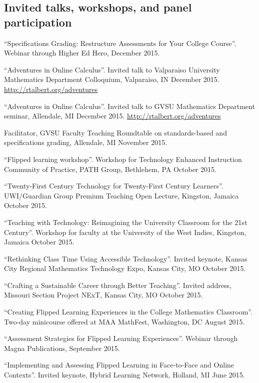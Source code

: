 \documentclass[letterpaper]{article}
\renewenvironment{itemize}{
  \begin{list}{}{
    \setlength{\leftmargin}{1.5em}
	\setlength{\itemsep}{0in}
  }
}{
  \end{list}
}
\begin{document}
\subsection*{Invited talks, workshops, and panel participation}
\begin{itemize}
	\item ``Specifications Grading: Restructure Assessments for Your College Course''. Webinar through Higher Ed Hero, December 2015. 
	\item ``Adventures in Online Calculus''. Invited talk to Valparaiso University Mathematics Department Colloquium, Valparaiso, IN December 2015. \url{http://rtalbert.org/adventures}
	\item ``Adventures in Online Calculus''. Invited talk to GVSU Mathematics Department seminar, Allendale, MI December 2015. \url{http://rtalbert.org/adventures}
	\item Facilitator, GVSU Faculty Teaching Roundtable on standards-based and specifications grading, Allendale, MI November 2015. 
	\item ``Flipped learning workshop''. Workshop for Technology Enhanced Instruction Community of Practice, PATH Group, Bethlehem, PA October 2015. 
	\item ``Twenty-First Century Technology for Twenty-First Century Learners''. UWI/Guardian Group Premium Teaching Open Lecture, Kingston, Jamaica October 2015. 
	\item ``Teaching with Technology: Reimagining the University Classroom for the 21st Century''. Workshop for faculty at the University of the West Indies, Kingston, Jamaica October 2015. 
	\item ``Rethinking Class Time Using Accessible Technology''. Invited keynote, Kansas City Regional Mathematics Technology Expo, Kansas City, MO October 2015. 
	\item ``Crafting a Sustainable Career through Better Teaching''. Invited address, Missouri Section Project NExT, Kansas City, MO October 2015. 
	\item ``Creating Flipped Learning Experiences in the College Mathematics Classroom''. Two-day minicourse offered at MAA MathFest, Washington, DC August 2015. 
	\item ``Assessment Strategies for Flipped Learning Experiences''. Webinar through Magna Publications, September 2015.
	\item ``Implementing and Assessing Flipped Learning in Face-to-Face and Online Contexts''. Invited keynote, Hybrid Learning Network, Holland, MI June 2015. 

\end{itemize}
\end{document}
